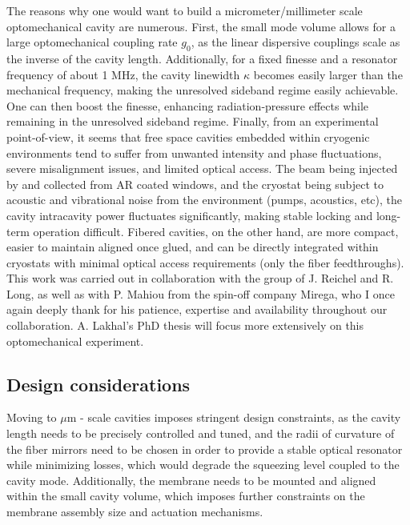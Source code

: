 The reasons why one would want to build a micrometer/millimeter scale optomechanical cavity are numerous. First, the small mode volume allows for a large optomechanical coupling rate $g_0$, as the linear dispersive couplings scale as the inverse of the cavity length. Additionally, for a fixed finesse and a resonator frequency of about 1 MHz, the cavity linewidth $\kappa$ becomes easily larger than the mechanical frequency, making the unresolved sideband regime easily achievable. One can then boost the finesse, enhancing radiation-pressure effects while remaining in the unresolved sideband regime. Finally, from an experimental point-of-view, it seems that free space cavities embedded within cryogenic environments tend to suffer from unwanted intensity and phase fluctuations, severe misalignment issues, and limited optical access. The beam being injected by and collected from AR coated windows, and the cryostat being subject to acoustic and vibrational noise from the environment (pumps, acoustics, etc), the cavity intracavity power fluctuates significantly, making stable locking and long-term operation difficult. Fibered cavities, on the other hand, are more compact, easier to maintain aligned once glued, and can be directly integrated within cryostats with minimal optical access requirements (only the fiber feedthroughs). \\

This work was carried out in collaboration with the group of J. Reichel and R. Long, as well as with P. Mahiou from the spin-off company Mirega, who I once again deeply thank for his patience, expertise and availability throughout our collaboration. A. Lakhal's PhD thesis will focus more extensively on this optomechanical experiment. 


\subsection{Design considerations}

Moving to $\mu$m - scale cavities imposes stringent design constraints, as the cavity length needs to be precisely controlled and tuned, and the radii of curvature of the fiber mirrors need to be chosen in order to provide a stable optical resonator while minimizing losses, which would degrade the squeezing level coupled to the cavity mode. Additionally, the membrane needs to be mounted and aligned within the small cavity volume, which imposes further constraints on the membrane assembly size and actuation mechanisms. 

